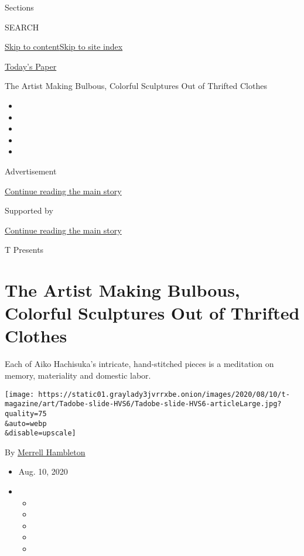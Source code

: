 Sections

SEARCH

\protect\hyperlink{site-content}{Skip to
content}\protect\hyperlink{site-index}{Skip to site index}

\href{https://myaccount.nytimes3xbfgragh.onion/auth/login?response_type=cookie\&client_id=vi}{}

\href{https://www.nytimes3xbfgragh.onion/section/todayspaper}{Today's
Paper}

The Artist Making Bulbous, Colorful Sculptures Out of Thrifted Clothes

\begin{itemize}
\item
\item
\item
\item
\item
\end{itemize}

Advertisement

\protect\hyperlink{after-top}{Continue reading the main story}

Supported by

\protect\hyperlink{after-sponsor}{Continue reading the main story}

T Presents

\hypertarget{the-artist-making-bulbous-colorful-sculptures-out-of-thrifted-clothes}{%
\section{The Artist Making Bulbous, Colorful Sculptures Out of Thrifted
Clothes}\label{the-artist-making-bulbous-colorful-sculptures-out-of-thrifted-clothes}}

Each of Aiko Hachisuka's intricate, hand-stitched pieces is a meditation
on memory, materiality and domestic labor.

\texttt{[image: https://static01.graylady3jvrrxbe.onion/images/2020/08/10/t-magazine/art/Tadobe-slide-HVS6/Tadobe-slide-HVS6-articleLarge.jpg?quality=75\\\&auto=webp\\\&disable=upscale]}

By
\href{https://www.nytimes3xbfgragh.onion/by/merrell-hambleton}{Merrell
Hambleton}

\begin{itemize}
\item
  Aug. 10, 2020
\item
  \begin{itemize}
  \item
  \item
  \item
  \item
  \item
  \end{itemize}
\end{itemize}

